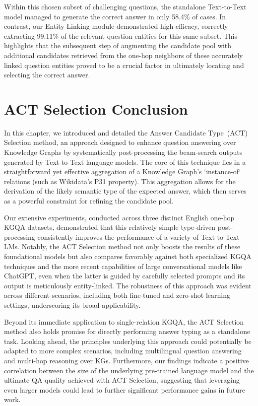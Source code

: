 Within this chosen subset of challenging questions, the standalone Text-to-Text model managed to generate the correct answer in only 58.4\% of cases. In contrast, our Entity Linking module demonstrated high efficacy, correctly extracting 99.11\% of the relevant question entities for this same subset. This highlights that the subsequent step of augmenting the candidate pool with additional candidates retrieved from the one-hop neighbors of these accurately linked question entities proved to be a crucial factor in ultimately locating and selecting the correct answer.


\section{ACT Selection Conclusion}
\label{sec:act_selection:conclusion}

In this chapter, we introduced and detailed the Answer Candidate Type~(ACT) Selection method, an approach designed to enhance question answering over Knowledge Graphs by systematically post-processing the beam-search outputs generated by Text-to-Text language models. The core of this technique lies in a straightforward yet effective aggregation of a Knowledge Graph's `instance-of` relations (such as Wikidata's P31 property). This aggregation allows for the derivation of the likely semantic type of the expected answer, which then serves as a powerful constraint for refining the candidate pool.

Our extensive experiments, conducted across three distinct English one-hop KGQA datasets, demonstrated that this relatively simple type-driven post-processing consistently improves the performance of a variety of Text-to-Text LMs. Notably, the ACT Selection method not only boosts the results of these foundational models but also compares favorably against both specialized KGQA techniques and the more recent capabilities of large conversational models like ChatGPT, even when the latter is guided by carefully selected prompts and its output is meticulously entity-linked. The robustness of this approach was evident across different scenarios, including both fine-tuned and zero-shot learning settings, underscoring its broad applicability.

Beyond its immediate application to single-relation KGQA, the ACT Selection method also holds promise for directly performing answer typing as a standalone task. Looking ahead, the principles underlying this approach could potentially be adapted to more complex scenarios, including multilingual question answering and multi-hop reasoning over KGs. Furthermore, our findings indicate a positive correlation between the size of the underlying pre-trained language model and the ultimate QA quality achieved with ACT Selection, suggesting that leveraging even larger models could lead to further significant performance gains in future work.



